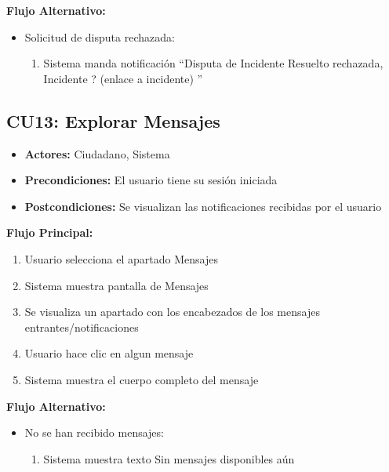 \begin{multicols}{2}
\begin{enumerate}
\end{enumerate}

\textbf{Flujo Alternativo:}
\begin{itemize}
    \item Solicitud de disputa rechazada:
    \begin{enumerate}
        \item Sistema manda notificación ``Disputa de Incidente Resuelto rechazada, Incidente ? (enlace a incidente) ''
    \end{enumerate}
\end{itemize}

\subsection*{CU13: Explorar Mensajes}
\begin{itemize}
    \item \textbf{Actores:} Ciudadano, Sistema
    \item \textbf{Precondiciones:} El usuario tiene su sesión iniciada
    \item \textbf{Postcondiciones:} Se visualizan las notificaciones recibidas por el usuario
\end{itemize}
\textbf{Flujo Principal:}
\begin{enumerate}
    \item Usuario selecciona el apartado Mensajes
    \item Sistema muestra pantalla de Mensajes
    \item Se visualiza un apartado con los encabezados de los mensajes entrantes/notificaciones
    \item Usuario hace clic en algun mensaje
    \item Sistema muestra el cuerpo completo del mensaje
\end{enumerate}

\textbf{Flujo Alternativo:}
\begin{itemize}
    \item No se han recibido mensajes:
    \begin{enumerate}
        \item Sistema muestra texto Sin mensajes disponibles aún
    \end{enumerate}
\end{itemize}


\end{multicols}
